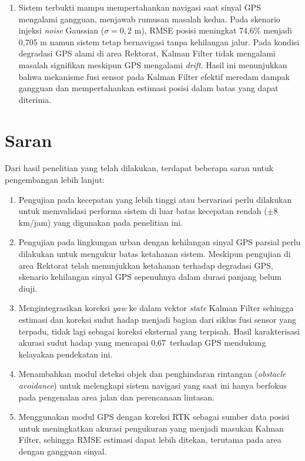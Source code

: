 \begin{enumerate}
    \item Sistem terbukti mampu mempertahankan navigasi saat sinyal GPS mengalami gangguan, menjawab rumusan masalah kedua.
    Pada skenario injeksi \emph{noise} Gaussian ($\sigma = 0,2$ m), RMSE posisi meningkat 74,6\% menjadi 0,705 m namun sistem tetap bernavigasi tanpa kehilangan jalur.
    Pada kondisi degradasi GPS alami di area Rektorat, Kalman Filter tidak mengalami masalah signifikan meskipun GPS mengalami \emph{drift}.
    Hasil ini menunjukkan bahwa mekanisme fusi sensor pada Kalman Filter efektif meredam dampak gangguan dan mempertahankan estimasi posisi dalam batas yang dapat diterima.
\end{enumerate}

\section{Saran}
\label{sec:saran}

Dari hasil penelitian yang telah dilakukan, terdapat beberapa saran untuk pengembangan lebih lanjut:

\begin{enumerate}
    \item Pengujian pada kecepatan yang lebih tinggi atau bervariasi perlu dilakukan untuk memvalidasi performa sistem di luar batas kecepatan rendah ($\pm$8 km/jam) yang digunakan pada penelitian ini.

    \item Pengujian pada lingkungan urban dengan kehilangan sinyal GPS parsial perlu dilakukan untuk mengukur batas ketahanan sistem.
    Meskipun pengujian di area Rektorat telah menunjukkan ketahanan terhadap degradasi GPS, skenario kehilangan sinyal GPS sepenuhnya dalam durasi panjang belum diuji.

    \item Mengintegrasikan koreksi \emph{yaw} ke dalam vektor \emph{state} Kalman Filter sehingga estimasi dan koreksi sudut hadap menjadi bagian dari siklus fusi sensor yang terpadu, tidak lagi sebagai koreksi eksternal yang terpisah.
    Hasil karakterisasi akurasi sudut hadap yang mencapai 0,67\textdegree\ terhadap GPS mendukung kelayakan pendekatan ini.

    \item Menambahkan modul deteksi objek dan penghindaran rintangan (\emph{obstacle avoidance}) untuk melengkapi sistem navigasi yang saat ini hanya berfokus pada pengenalan area jalan dan perencanaan lintasan.

    \item Menggunakan modul GPS dengan koreksi RTK sebagai sumber data posisi untuk meningkatkan akurasi pengukuran yang menjadi masukan Kalman Filter, sehingga RMSE estimasi dapat lebih ditekan, terutama pada area dengan gangguan sinyal.
\end{enumerate}
